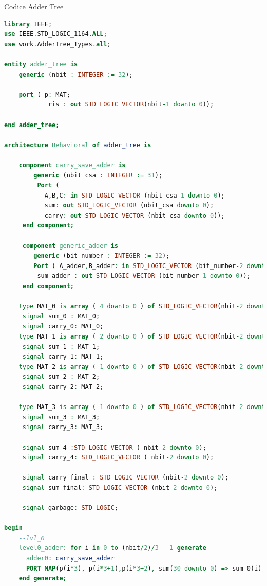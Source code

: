 \begin{problem}{Codice Adder Tree}{}
\begin{lstlisting}[language=VHDL]
library IEEE;
use IEEE.STD_LOGIC_1164.ALL;
use work.AdderTree_Types.all;

entity adder_tree is
    generic (nbit : INTEGER := 32);
    
    port ( p: MAT;
            ris : out STD_LOGIC_VECTOR(nbit-1 downto 0));
    
end adder_tree;

architecture Behavioral of adder_tree is

    component carry_save_adder is 
        generic (nbit_csa : INTEGER := 31);
         Port ( 
           A,B,C: in STD_LOGIC_VECTOR (nbit_csa-1 downto 0);
           sum: out STD_LOGIC_VECTOR (nbit_csa downto 0);
           carry: out STD_LOGIC_VECTOR (nbit_csa downto 0));
     end component;     
   
     component generic_adder is 
        generic (bit_number : INTEGER := 32);
        Port ( A_adder,B_adder: in STD_LOGIC_VECTOR (bit_number-2 downto 0);
         sum_adder : out STD_LOGIC_VECTOR (bit_number-1 downto 0));
     end component;
    
    type MAT_0 is array ( 4 downto 0 ) of STD_LOGIC_VECTOR(nbit-2 downto 0);
     signal sum_0 : MAT_0;
     signal carry_0: MAT_0;
    type MAT_1 is array ( 2 downto 0 ) of STD_LOGIC_VECTOR(nbit-2 downto 0);
     signal sum_1 : MAT_1;
     signal carry_1: MAT_1;
    type MAT_2 is array ( 1 downto 0 ) of STD_LOGIC_VECTOR(nbit-2 downto 0);
     signal sum_2 : MAT_2;
     signal carry_2: MAT_2;
     
    type MAT_3 is array ( 1 downto 0 ) of STD_LOGIC_VECTOR(nbit-2 downto 0);
     signal sum_3 : MAT_3;
     signal carry_3: MAT_3;
     
     signal sum_4 :STD_LOGIC_VECTOR ( nbit-2 downto 0);
     signal carry_4: STD_LOGIC_VECTOR ( nbit-2 downto 0);
     
     signal carry_final : STD_LOGIC_VECTOR (nbit-2 downto 0);
     signal sum_final: STD_LOGIC_VECTOR (nbit-2 downto 0);
     
     signal garbage: STD_LOGIC;
     
begin 
    --lvl_0
    level0_adder: for i in 0 to (nbit/2)/3 - 1 generate
      adder0: carry_save_adder 
      PORT MAP(p(i*3), p(i*3+1),p(i*3+2), sum(30 downto 0) => sum_0(i), sum(31) => garbage, carry(30 downto 0) => carry_0(i), carry(31) => garbage);
    end generate;
    

\end{lstlisting}
\end{problem}
